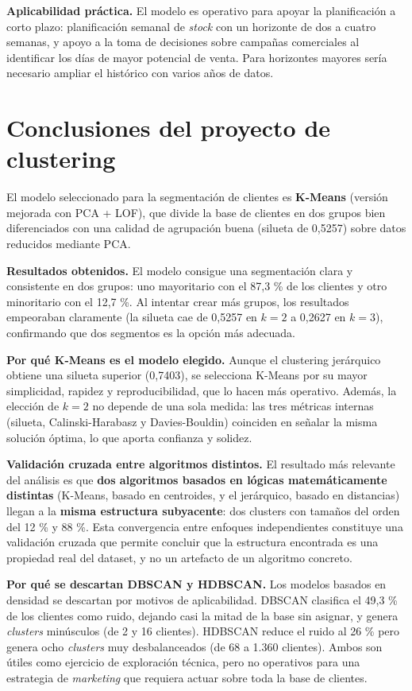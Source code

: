 \documentclass[11pt,a4paper]{article}
\begin{document}
\textbf{Aplicabilidad práctica.} El modelo es operativo para apoyar la planificación a corto plazo: planificación semanal de \textit{stock} con un horizonte de dos a cuatro semanas, y apoyo a la toma de decisiones sobre campañas comerciales al identificar los días de mayor potencial de venta. Para horizontes mayores sería necesario ampliar el histórico con varios años de datos.

\section{Conclusiones del proyecto de clustering}

El modelo seleccionado para la segmentación de clientes es \textbf{K-Means} (versión mejorada con PCA + LOF), que divide la base de clientes en dos grupos bien diferenciados con una calidad de agrupación buena (silueta de 0,5257) sobre datos reducidos mediante PCA.

\textbf{Resultados obtenidos.} El modelo consigue una segmentación clara y consistente en dos grupos: uno mayoritario con el 87,3 \% de los clientes y otro minoritario con el 12,7 \%. Al intentar crear más grupos, los resultados empeoraban claramente (la silueta cae de 0,5257 en $k=2$ a 0,2627 en $k=3$), confirmando que dos segmentos es la opción más adecuada.

\textbf{Por qué K-Means es el modelo elegido.} Aunque el clustering jerárquico obtiene una silueta superior (0,7403), se selecciona K-Means por su mayor simplicidad, rapidez y reproducibilidad, que lo hacen más operativo. Además, la elección de $k=2$ no depende de una sola medida: las tres métricas internas (silueta, Calinski-Harabasz y Davies-Bouldin) coinciden en señalar la misma solución óptima, lo que aporta confianza y solidez.

\textbf{Validación cruzada entre algoritmos distintos.} El resultado más relevante del análisis es que \textbf{dos algoritmos basados en lógicas matemáticamente distintas} (K-Means, basado en centroides, y el jerárquico, basado en distancias) llegan a la \textbf{misma estructura subyacente}: dos clusters con tamaños del orden del 12 \% y 88 \%. Esta convergencia entre enfoques independientes constituye una validación cruzada que permite concluir que la estructura encontrada es una propiedad real del dataset, y no un artefacto de un algoritmo concreto.

\textbf{Por qué se descartan DBSCAN y HDBSCAN.} Los modelos basados en densidad se descartan por motivos de aplicabilidad. DBSCAN clasifica el 49,3 \% de los clientes como ruido, dejando casi la mitad de la base sin asignar, y genera \textit{clusters} minúsculos (de 2 y 16 clientes). HDBSCAN reduce el ruido al 26 \% pero genera ocho \textit{clusters} muy desbalanceados (de 68 a 1.360 clientes). Ambos son útiles como ejercicio de exploración técnica, pero no operativos para una estrategia de \textit{marketing} que requiera actuar sobre toda la base de clientes.
\end{document}
